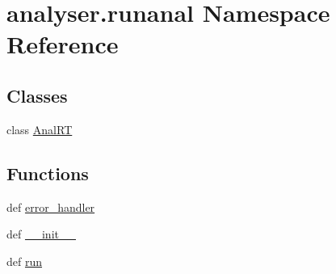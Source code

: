 \hypertarget{namespaceanalyser_1_1runanal}{\section{analyser.\-runanal Namespace Reference}
\label{namespaceanalyser_1_1runanal}
}
\subsection*{Classes}
\begin{DoxyCompactItemize}
\item 
class \hyperlink{classanalyser_1_1runanal_1_1_anal_r_t}{Anal\-R\-T}
\end{DoxyCompactItemize}
\subsection*{Functions}
\begin{DoxyCompactItemize}
\item 
def \hyperlink{namespaceanalyser_1_1runanal_a3b76ecd0893d712faf3d01ecda9bcf60}{error\-\_\-handler}
\item 
def \hyperlink{namespaceanalyser_1_1runanal_ae52cd6ae7d15c438c57923641d847356}{\-\_\-\-\_\-init\-\_\-\-\_\-}
\item 
def \hyperlink{namespaceanalyser_1_1runanal_af11edd15ec5943a22e056ffdef4f36f6}{run}
\end{DoxyCompactItemize}
